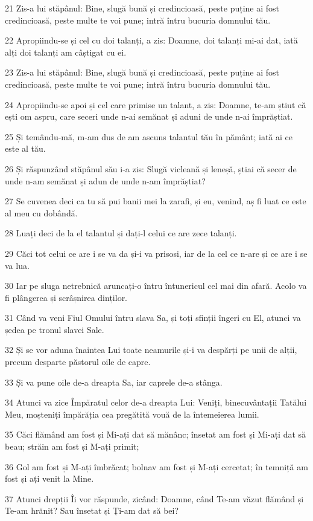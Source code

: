 \par 21 Zis-a lui stăpânul: Bine, slugă bună și credincioasă, peste puține ai fost credincioasă, peste multe te voi pune; intră întru bucuria domnului tău.
\par 22 Apropiindu-se și cel cu doi talanți, a zis: Doamne, doi talanți mi-ai dat, iată alți doi talanți am câștigat cu ei.
\par 23 Zis-a lui stăpânul: Bine, slugă bună și credincioasă, peste puține ai fost credincioasă, peste multe te voi pune; intră întru bucuria domnului tău.
\par 24 Apropiindu-se apoi și cel care primise un talant, a zis: Doamne, te-am știut că ești om aspru, care seceri unde n-ai semănat și aduni de unde n-ai împrăștiat.
\par 25 Și temându-mă, m-am dus de am ascuns talantul tău în pământ; iată ai ce este al tău.
\par 26 Și răspunzând stăpânul său i-a zis: Slugă vicleană și leneșă, știai că secer de unde n-am semănat și adun de unde n-am împrăștiat?
\par 27 Se cuvenea deci ca tu să pui banii mei la zarafi, și eu, venind, aș fi luat ce este al meu cu dobândă.
\par 28 Luați deci de la el talantul și dați-l celui ce are zece talanți.
\par 29 Căci tot celui ce are i se va da și-i va prisosi, iar de la cel ce n-are și ce are i se va lua.
\par 30 Iar pe sluga netrebnică aruncați-o întru întunericul cel mai din afară. Acolo va fi plângerea și scrâșnirea dinților.
\par 31 Când va veni Fiul Omului întru slava Sa, și toți sfinții îngeri cu El, atunci va ședea pe tronul slavei Sale.
\par 32 Și se vor aduna înaintea Lui toate neamurile și-i va despărți pe unii de alții, precum desparte păstorul oile de capre.
\par 33 Și va pune oile de-a dreapta Sa, iar caprele de-a stânga.
\par 34 Atunci va zice Împăratul celor de-a dreapta Lui: Veniți, binecuvântații Tatălui Meu, moșteniți împărăția cea pregătită vouă de la întemeierea lumii.
\par 35 Căci flămând am fost și Mi-ați dat să mănânc; însetat am fost și Mi-ați dat să beau; străin am fost și M-ați primit;
\par 36 Gol am fost și M-ați îmbrăcat; bolnav am fost și M-ați cercetat; în temniță am fost și ați venit la Mine.
\par 37 Atunci drepții Îi vor răspunde, zicând: Doamne, când Te-am văzut flămând și Te-am hrănit? Sau însetat și Ți-am dat să bei?
